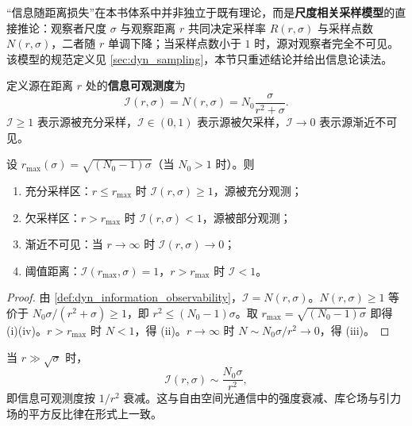 \begin{remark}[理论定位]\label{rem:dyn_information_distance_positioning}
“信息随距离损失”在本书体系中并非独立于既有理论，而是\textbf{尺度相关采样模型}的直接推论：观察者尺度 $\sigma$ 与观察距离 $r$ 共同决定采样率 $R(r,\sigma)$ 与采样点数 $N(r,\sigma)$，二者随 $r$ 单调下降；当采样点数小于 $1$ 时，源对观察者完全不可见。该模型的规范定义见 \cref{sec:dyn_sampling}，本节只重述结论并给出信息论读法。
\end{remark}

\begin{definition}[信息可观测度]\label{def:dyn_information_observability}
定义源在距离 $r$ 处的\textbf{信息可观测度}为
\[
\mathcal I(r,\sigma)=N(r,\sigma)=N_0\frac{\sigma}{r^2+\sigma}.
\]
$\mathcal I\ge 1$ 表示源被充分采样，$\mathcal I\in(0,1)$ 表示源被欠采样，$\mathcal I\to 0$ 表示源渐近不可见。
\end{definition}

\begin{theorem}[信息随距离损失定理]\label{thm:dyn_information_distance_decay}
设 $r_{\max}(\sigma)=\sqrt{(N_0-1)\sigma}$（当 $N_0>1$ 时）。则
\begin{enumerate}[label=(\roman*)]
    \item 充分采样区：$r\le r_{\max}$ 时 $\mathcal I(r,\sigma)\ge 1$，源被充分观测；
    \item 欠采样区：$r>r_{\max}$ 时 $\mathcal I(r,\sigma)<1$，源被部分观测；
    \item 渐近不可见：当 $r\to\infty$ 时 $\mathcal I(r,\sigma)\to 0$；
    \item 阈值距离：$\mathcal I(r_{\max},\sigma)=1$，$r>r_{\max}$ 时 $\mathcal I<1$。
\end{enumerate}
\end{theorem}

\begin{proof}
由 \cref{def:dyn_information_observability}，$\mathcal I=N(r,\sigma)$。$N(r,\sigma)\ge 1$ 等价于 $N_0\sigma/(r^2+\sigma)\ge 1$，即 $r^2\le (N_0-1)\sigma$。取 $r_{\max}=\sqrt{(N_0-1)\sigma}$ 即得 (i)(iv)。$r>r_{\max}$ 时 $N<1$，得 (ii)。$r\to\infty$ 时 $N\sim N_0\sigma/r^2\to 0$，得 (iii)。
\end{proof}

\begin{corollary}[渐近幂律]\label{cor:dyn_information_asymptotic}
当 $r\gg\sqrt{\sigma}$ 时，
\[
\mathcal I(r,\sigma)\sim \frac{N_0\sigma}{r^2},
\]
即信息可观测度按 $1/r^2$ 衰减。这与自由空间光通信中的强度衰减、库仑场与引力场的平方反比律在形式上一致。
\end{corollary}

